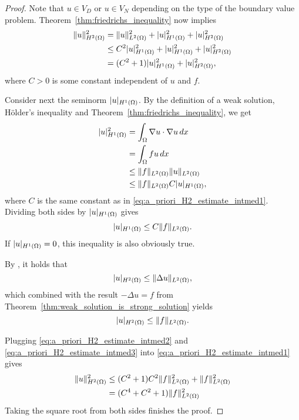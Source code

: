 \documentclass[english, 12pt, a4paper, sci, utf8, a-2b, online]{aaltothesis}
\theoremstyle{definition}
\theoremstyle{plain}
\DeclarePairedDelimiter\abs{\lvert}{\rvert}
\DeclarePairedDelimiter\norm{\lVert}{\rVert}
\newcommand*\diff{\mathop{}\!d}
\numberwithin{equation}{section}
\begin{document}
\begin{proof}
    Note that $u \in V_D$ or $u \in V_N$ depending
    on the type of the boundary value problem.
    Theorem~\ref{thm:friedrichs_inequality} now implies
    \begin{align}
        \norm{u}_{H^2(\Omega)}^2
        &= \norm{u}_{L^2(\Omega)}^2
            + \abs{u}_{H^1(\Omega)}^2
                + \abs{u}_{H^2(\Omega)}^2 \nonumber \\
        &\leq C^2 \abs{u}_{H^1(\Omega)}^2
            + \abs{u}_{H^1(\Omega)}^2
                + \abs{u}_{H^2(\Omega)}^2 \nonumber \\
        \label{eq:a_priori_H2_estimate_intmed1}
        &= (C^2 + 1) \abs{u}_{H^1(\Omega)}^2 + \abs{u}_{H^2(\Omega)}^2,
    \end{align}
    where $C > 0$ is some constant independent of $u$ and $f$.

    Consider next the seminorm $\abs{u}_{H^1(\Omega)}$.
    By the definition of a weak solution, Hölder's inequality
    and Theorem~\ref{thm:friedrichs_inequality}, we get
    \begin{align*}
        \abs{u}_{H^1(\Omega)}^2
        &= \int_{\Omega} \nabla u \cdot \nabla u \diff x \\
        &= \int_{\Omega} f u \diff x \\
        &\leq \norm{f}_{L^2(\Omega)} \norm{u}_{L^2(\Omega)} \\
        &\leq \norm{f}_{L^2(\Omega)} C \abs{u}_{H^1(\Omega)},
    \end{align*}
    where $C$ is the same constant as in \eqref{eq:a_priori_H2_estimate_intmed1}.
    Dividing both sides by $\abs{u}_{H^1(\Omega)}$ gives
    \begin{equation}
        \label{eq:a_priori_H2_estimate_intmed2}
        \abs{u}_{H^1(\Omega)} \leq C \norm{f}_{L^2(\Omega)}.
    \end{equation}
    If $\abs{u}_{H^1(\Omega)} = 0$, this inequality is also obviously true.

    By \cite[Proof of Theorem 4.3.1.4 on p. 199]{grisvard2011}, it holds that
    \begin{equation*}
        \abs{u}_{H^2(\Omega)} \leq \norm{\Delta u}_{L^2(\Omega)},
    \end{equation*}
    which combined with the result $-\Delta u = f$ from
    Theorem~\ref{thm:weak_solution_is_strong_solution} yields
    \begin{equation}
        \label{eq:a_priori_H2_estimate_intmed3}
        \abs{u}_{H^2(\Omega)} \leq \norm{f}_{L^2(\Omega)}.
    \end{equation}

    Plugging \eqref{eq:a_priori_H2_estimate_intmed2}
    and \eqref{eq:a_priori_H2_estimate_intmed3}
    into \eqref{eq:a_priori_H2_estimate_intmed1} gives
    \begin{align*}
        \norm{u}_{H^2(\Omega)}^2
        &\leq (C^2+1) C^2 \norm{f}_{L^2(\Omega)}^2 + \norm{f}_{L^2(\Omega)}^2 \\
        &= (C^4 + C^2 + 1) \norm{f}_{L^2(\Omega)}^2
    \end{align*}
    Taking the square root from both sides finishes the proof.
\end{proof}
\end{document}
